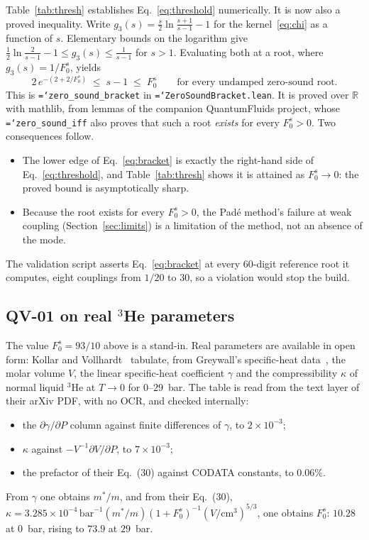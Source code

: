 \documentclass[11pt,a4paper]{article}
\newcommand{\Fzs}{F_0^{s}}
\newcommand{\code}[1]{\texttt{\hyphenchar\font=`\-\relax #1}}
\begin{document}
Table~\ref{tab:thresh} establishes Eq.~\eqref{eq:threshold} numerically. It is now also a proved
inequality. Write $g_3(s) = \tfrac{s}{2}\ln\tfrac{s+1}{s-1}-1$ for the kernel~\eqref{eq:chi} as a
function of $s$. Elementary bounds on the logarithm give
$\tfrac12\ln\tfrac{2}{s-1}-1 \le g_3(s) \le \tfrac{1}{s-1}$ for $s>1$. Evaluating both at a root,
where $g_3(s)=1/\Fzs$, yields
\begin{equation}
  2\,e^{-(2+2/\Fzs)} \;\le\; s-1 \;\le\; \Fzs
  \qquad\text{for every undamped zero-sound root.}
  \label{eq:bracket}
\end{equation}
This is \code{zero\_sound\_bracket} in \code{ZeroSoundBracket.lean}. It is proved over
$\mathbb{R}$ with mathlib, from lemmas of the companion QuantumFluids project, whose
\code{zero\_sound\_iff} also proves that such a root \emph{exists} for every $\Fzs>0$. Two
consequences follow.
\begin{itemize}
  \item The lower edge of Eq.~\eqref{eq:bracket} is exactly the right-hand side of
        Eq.~\eqref{eq:threshold}, and Table~\ref{tab:thresh} shows it is attained as
        $\Fzs\to0$: the proved bound is asymptotically sharp.
  \item Because the root exists for every $\Fzs>0$, the Pad\'e method's failure at weak
        coupling (Section~\ref{sec:limits}) is a limitation of the method, not an absence of
        the mode.
\end{itemize}
The validation script asserts Eq.~\eqref{eq:bracket} at every $60$-digit reference root it
computes, eight couplings from $1/20$ to $30$, so a violation would stop the build.

\subsection{QV-01 on real \texorpdfstring{$^3$He}{3He} parameters}
\label{sec:realhe3}

The value $\Fzs=93/10$ above is a stand-in. Real parameters are available in open form:
Kollar and Vollhardt~\cite{kollar2000} tabulate, from Greywall's specific-heat
data~\cite{greywall1983}, the molar volume $V$, the linear specific-heat coefficient $\gamma$ and
the compressibility $\kappa$ of normal liquid $^3$He at $T\to0$ for $0$--$29$~bar. The table is
read from the text layer of their arXiv PDF, with no OCR, and checked internally:
\begin{itemize}
  \item the $\partial\gamma/\partial P$ column against finite differences of $\gamma$, to
        $2\times10^{-3}$;
  \item $\kappa$ against $-V^{-1}\partial V/\partial P$, to $7\times10^{-3}$;
  \item the prefactor of their Eq.~(30) against CODATA constants, to $0.06\%$.
\end{itemize}
From $\gamma$ one obtains $m^*/m$, and from their Eq.~(30),
$\kappa=3.285\times10^{-4}\,\mathrm{bar}^{-1}(m^*/m)(1+\Fzs)^{-1}(V/\mathrm{cm}^3)^{5/3}$, one
obtains $\Fzs$: $10.28$ at $0$~bar, rising to $73.9$ at $29$~bar.
\end{document}
